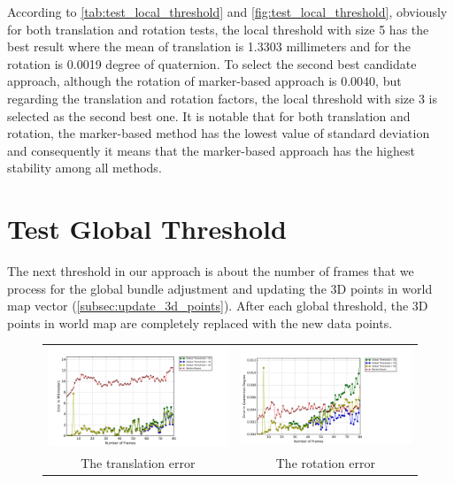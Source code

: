 According to \autoref{tab:test_local_threshold} and \autoref{fig:test_local_threshold}, obviously for both translation and rotation tests, the local threshold with size 5 has the best result where the mean of translation is 1.3303 millimeters and for the rotation is 0.0019 degree of quaternion. To select the second best candidate approach, although the rotation of marker-based approach is 0.0040, but regarding the translation and rotation factors, the local threshold with size 3 is selected as the second best one. It is notable that for both translation and rotation, the marker-based method has the lowest value of standard deviation and consequently it means that the marker-based approach has the highest stability among all methods.

\section{Test Global Threshold} \label{sec:global_threshold}
The next threshold in our approach is about the number of frames that we process for the global bundle adjustment and updating the 3D points in world map vector (\autoref{subsec:update_3d_points}). After each global threshold, the 3D points in world map are completely replaced with the new data points.
\begin{figure}[H]
\centering
\begin{tabular}{cc}
  \includegraphics[width=80mm]{figures/global/graph_translation} &   \includegraphics[width=80mm]{figures/global/graph_rotation}  \\
  The translation error & The rotation error \\[6pt]
\end{tabular}
\caption{}\label{fig:test_global_threshold}

\end{figure}
